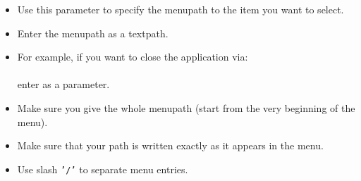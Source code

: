 \begin{itemize}
\item Use this parameter to specify the menupath to the item you want to select.
\item Enter the menupath as a textpath.
\item For example, if you want to close the application via:\\
\\
enter  as a parameter.
\item Make sure you give the whole menupath (start from the very beginning of the menu).
\item Make sure that your path is written exactly as it appears in the menu. 
\item Use slash {\tt '/'} to separate menu entries.
\end{itemize}
